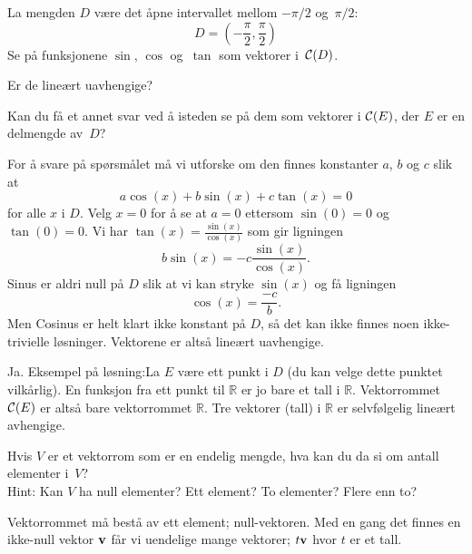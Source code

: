 \begin{oppgave}
La mengden $D$ være det åpne intervallet mellom $-\pi/2$ og~$\pi/2$:
\[
D = \left( - \frac{\pi}{2}, \frac{\pi}{2} \right)
\]
Se på funksjonene $\sin$, $\cos$ og~$\tan$ som vektorer i~$\mathcal{C}(D)$.
\begin{punkt}
Er de lineært uavhengige?
\end{punkt}
\begin{punkt}
Kan du få et annet svar ved å isteden se på dem som vektorer i
$\mathcal{C}(E)$, der $E$ er en delmengde av~$D$?
\end{punkt}
\end{oppgave}

\begin{losning}
\begin{punkt}
For å svare på spørsmålet må vi utforske om den finnes konstanter $a$, $b$ og $c$ slik at $$a\cos(x)+b\sin(x)+c\tan(x)=0$$ for alle $x$ i $D$. Velg $x=0$ for å se at $a=0$ ettersom $\sin(0)=0$ og $\tan(0)=0$. Vi har $\tan(x)=\frac{\sin(x)}{\cos(x)}$ som gir ligningen $$b\sin(x)=-c\frac{\sin(x)}{\cos(x)}.$$ Sinus er aldri null på $D$ slik at vi kan stryke $\sin(x)$ og få ligningen $$\cos(x)=\frac{-c}{b}.$$ Men Cosinus er helt klart ikke konstant på $D$, så det kan ikke finnes noen ikke-trivielle løsninger. Vektorene er altså lineært uavhengige.
\end{punkt}

\begin{punkt}
Ja. Eksempel på løsning:La $E$ være ett punkt i $D$ (du kan velge dette punktet vilkårlig). En funksjon fra ett punkt til $\mathbb{R}$ er jo bare et tall i $\mathbb{R}$. Vektorrommet $\mathcal{C}(E)$ er altså bare vektorrommet $\mathbb{R}$. Tre vektorer (tall) i $\mathbb{R}$ er selvfølgelig lineært avhengige.
\end{punkt}

\end{losning}


\begin{oppgave}
Hvis $V$ er et vektorrom som er en endelig mengde, hva kan du da si om
antall elementer i~$V$?
\\
Hint: Kan $V$ ha null elementer?  Ett element?  To elementer?  Flere
enn to?
\end{oppgave}

\begin{losning}
Vektorrommet må bestå av ett element; null-vektoren. Med en gang det finnes en ikke-null vektor $\mathbf{v}$ får vi uendelige mange vektorer; $t\mathbf{v}$ hvor $t$ er et tall.
\end{losning}


